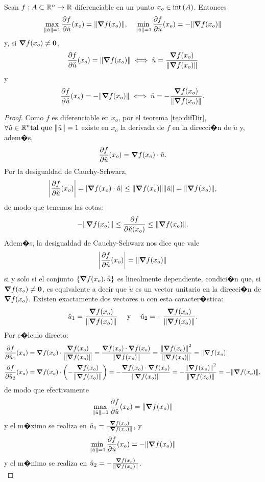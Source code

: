 \documentclass[a4paper]{scrartcl} %
\begin{document}
\begin{theorem} \label{teo:max_deriv}
\mbox{}

 Sean $f: A \subset \mathbb{R}^n \to \mathbb{R}$ diferenciable en un punto $x_o \in \operatorname{int}{(A)}$. Entonces 
 \[
  \max_{\norm{\check{u}} = 1} \frac{\partial f}{\partial \check{u}} (x_o) = \norm{\grad f (x_o)}, \quad 
  \min_{\norm{\check{u}} = 1} \frac{\partial f}{\partial \check{u}} (x_o) = -\norm{\grad f (x_o)}
 \]
y, si $\grad f(x_o) \ne \mathbf{0}$,
\[
 \frac{\partial f}{\partial \check{u}} (x_o) = \norm{\grad f (x_o)} \iff \check{u} = \frac{\grad f(x_o)}{\norm{\grad f(x_o)}}
\]
y
\[
 \frac{\partial f}{\partial \check{u}} (x_o) = -\norm{\grad f (x_o)} \iff \check{u} = -\frac{\grad f(x_o)}{\norm{\grad f(x_o)}}.
\]
\begin{proof}
\mbox{}

 Como $f$ es diferenciable en $x_o$, por el teorema \eqref{teo:difDir}, $\forall \check{u} \in \mathbb{R}^n \text{tal que } \norm{\check{u}} = 1$ existe en $x_o$ la derivada de $f$ en la direcci�n de $\check{u}$ y, adem�s,
\[
 \frac{\partial f}{\partial \check{u}} (x_o) = \grad f (x_o) \cdot \check{u}.
\]
Por la desigualdad de Cauchy-Schwarz, 
\[
 \abs{\frac{\partial f}{\partial \check{u}} (x_o)} = \abs{\grad f (x_o) \cdot \check{u}} \le \norm{\grad f (x_o)}\norm{\check{u}} = \norm{\grad f (x_o)},
\]
de modo que tenemos las cotas:
\[
 -\norm{\grad f (x_o)} \le \frac{\partial f}{\partial \check{u} (x_o)} \le \norm{\grad f (x_o)}.
\]
Adem�s, la desigualdad de Cauchy-Schwarz nos dice que vale
\[
 \abs{\frac{\partial f}{\partial \check{u}} (x_o)} = \norm{\grad f (x_o)}
\]
si y solo si el conjunto $\{\grad f(x_o), \check{u} \}$ es linealmente dependiente, condici�n que, si $\grad f(x_o) \ne \mathbf{0}$, es equivalente a decir que $\check{u}$ es un vector unitario en la direcci�n de $\grad f(x_o)$. Existen exactamente dos vectores $\check{u}$ con esta caracter�stica:
\[
 \check{u}_1 = \frac{\grad f(x_o)}{\norm{\grad f(x_o)}} \quad \text{ y } \quad \check{u}_2 = -\frac{\grad f(x_o)}{\norm{\grad f(x_o)}}.
\]
Por c�lculo directo:
\begin{align*}
 \frac{\partial f}{\partial \check{u}_1} (x_o) &= \grad f (x_o) \cdot \frac{\grad f(x_o)}{\norm{\grad f(x_o)}} = \frac{ \grad f (x_o) \cdot \grad f(x_o) }{\norm{\grad f(x_o)}} = \frac{\norm{\grad f (x_o)}^2 }{\norm{\grad f(x_o)}} = \norm{\grad f (x_o)} \\
%  
 \frac{\partial f}{\partial \check{u}_2} (x_o) &= \grad f (x_o) \cdot \left( - \frac{\grad f(x_o)}{\norm{\grad f(x_o)}} \right) = -\frac{ \grad f (x_o) \cdot \grad f(x_o) }{\norm{\grad f(x_o)}} = -\frac{\norm{\grad f (x_o)}^2 }{\norm{\grad f(x_o)}} = -\norm{\grad f (x_o)},
\end{align*}
de modo que efectivamente
\[
 \max_{\norm{\check{u}}=1} \frac{\partial f}{\partial \check{u}} (x_o) = \norm{\grad f (x_o)}
\]
y el m�ximo se realiza en $\check{u}_1 = \frac{\grad f(x_o)}{\norm{\grad f(x_o)}}$,
y
\[
 \min_{\norm{\check{u}}=1} \frac{\partial f}{\partial \check{u}} (x_o) = -\norm{\grad f (x_o)}
\]
y el m�nimo se realiza en $\check{u}_2 = -\frac{\grad f(x_o)}{\norm{\grad f(x_o)}}$. \\


\end{proof}
\end{theorem}
\end{document}
